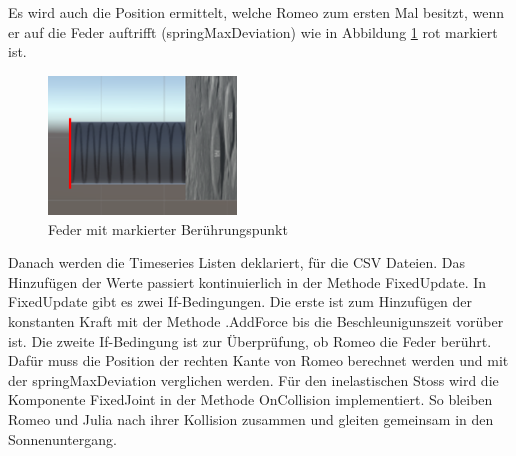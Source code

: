 \documentclass[../main.tex]{subfiles}
\begin{document}
    \begin{lstinputlisting}[label={lst:graphInelastic}, firstline=82, lastline=83]
    {\cubeControllerFile}
    \end{lstinputlisting}
    Es wird auch die Position ermittelt, welche Romeo zum ersten Mal besitzt, wenn er auf die Feder auftrifft (springMaxDeviation) wie in Abbildung \ref{fig:2Lab_SpringDeviation} rot markiert ist.
    \begin{lstinputlisting}[label={lst:graphInelastic}, firstline=84, lastline=85]
    {\cubeControllerFile}
    \end{lstinputlisting}


    \begin{figure}[H]
        \begin{center}
            \centerline{\includegraphics[width=50mm]{./images/2Lab_SpringDeviation.PNG}}
            \caption{Feder mit markierter Berührungspunkt}
            \label{fig:2Lab_SpringDeviation}
        \end{center}
    \end{figure}
    Danach werden die Timeseries Listen deklariert, für die CSV Dateien. Das Hinzufügen der Werte passiert kontinuierlich in der Methode FixedUpdate.
    \newline
    In FixedUpdate gibt es zwei If-Bedingungen. Die erste ist zum Hinzufügen der konstanten Kraft mit der Methode .AddForce bis die Beschleunigunszeit vorüber ist.
    Die zweite If-Bedingung ist zur Überprüfung, ob Romeo die Feder berührt. Dafür muss die Position der rechten Kante von Romeo berechnet werden und mit der
    springMaxDeviation verglichen werden.
    Für den inelastischen Stoss wird die Komponente FixedJoint in der Methode OnCollision implementiert. So bleiben Romeo und Julia nach ihrer
    Kollision zusammen und gleiten gemeinsam in den Sonnenuntergang.
\end{document}
